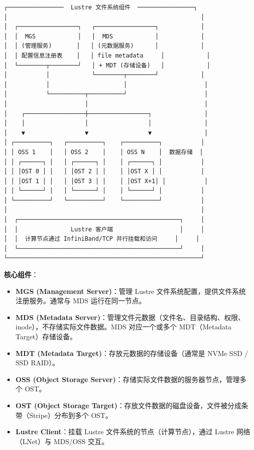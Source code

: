 \documentclass[12pt,UTF8]{ctexbook}
\begin{document}
\begin{lstlisting}
┌────────────────  Lustre 文件系统组件  ────────────────┐
│                                                       │
│  ┌─────────────────┐   ┌─────────────────┐            │
│  │  MGS            │   │  MDS            │            │
│  │ (管理服务)       │   │ (元数据服务)      │            │
│  │ 配置信息注册表    │   │ file metadata     │            │
│  └────────┬────────┘   │ + MDT (存储设备)   │            │
│           │            └────────┬────────┘            │
│           │                     │                      │
│           └──────────┬──────────┘                      │
│                      │                                 │
│    ┌─────────────────┼─────────────────┐               │
│    │                 │                 │               │
│    ▼                 ▼                 ▼               │
│ ┌──────────┐   ┌──────────┐    ┌──────────┐           │
│ │ OSS 1    │   │ OSS 2    │    │ OSS N    │  数据存储  │
│ │ ┌──────┐ │   │ ┌──────┐ │    │ ┌──────┐ │           │
│ │ │OST 0 │ │   │ │OST 2 │ │    │ │OST X │ │           │
│ │ │OST 1 │ │   │ │OST 3 │ │    │ │OST X+1│ │           │
│ │ └──────┘ │   │ └──────┘ │    │ └──────┘ │           │
│ └──────────┘   └──────────┘    └──────────┘           │
│                                                       │
│  ┌──────────────────────────────────────────────┐     │
│  │               Lustre 客户端                   │     │
│  │  计算节点通过 InfiniBand/TCP 并行挂载和访问     │     │
│  └──────────────────────────────────────────────┘     │
└───────────────────────────────────────────────────────┘
\end{lstlisting}

\textbf{核心组件}：

\begin{itemize}
    \item \textbf{MGS (Management Server)}：管理 Lustre 文件系统配置，提供文件系统注册服务。通常与 MDS 运行在同一节点。
    \item \textbf{MDS (Metadata Server)}：管理文件元数据（文件名、目录结构、权限、inode），不存储实际文件数据。MDS 对应一个或多个 MDT（Metadata Target）存储设备。
    \item \textbf{MDT (Metadata Target)}：存放元数据的存储设备（通常是 NVMe SSD / SSD RAID）。
    \item \textbf{OSS (Object Storage Server)}：存储实际文件数据的服务器节点，管理多个 OST。
    \item \textbf{OST (Object Storage Target)}：存放文件数据的磁盘设备，文件被分成条带（Stripe）分布到多个 OST。
    \item \textbf{Lustre Client}：挂载 Lustre 文件系统的节点（计算节点），通过 Lustre 网络（LNet）与 MDS/OSS 交互。
\end{itemize}
\end{document}
